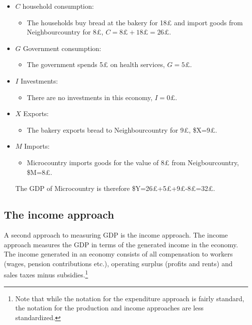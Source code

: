 \documentclass[]{book}
\providecommand{\tightlist}{%
  \setlength{\itemsep}{0pt}\setlength{\parskip}{0pt}}
\let\rmarkdownfootnote\footnote%
\def\footnote{\protect\rmarkdownfootnote}
\begin{document}
\begin{itemize}
\tightlist
\item
  \(C\) household consumption:

  \begin{itemize}
  \tightlist
  \item
    The households buy bread at the bakery for 18£ and import goods from Neighbourcountry for 8£, \(C=8£+18£=26£\).
  \end{itemize}
\item
  \(G\) Government consumption:

  \begin{itemize}
  \tightlist
  \item
    The government spends 5£ on health services, \(G=5£\).
  \end{itemize}
\item
  \(I\) Investments:

  \begin{itemize}
  \tightlist
  \item
    There are no investments in this economy, \(I=0£\).
  \end{itemize}
\item
  \(X\) Exports:

  \begin{itemize}
  \tightlist
  \item
    The bakery exports bread to Neighbourcountry for 9£, \$X=9£.
  \end{itemize}
\item
  \(M\) Imports:

  \begin{itemize}
  \tightlist
  \item
    Microcountry imports goods for the value of 8£ from Neigbourcountry, \$M=8£.
  \end{itemize}

  The GDP of Microcountry is therefore \$Y=26£+5£+9£-8£=32£.
\end{itemize}

\hypertarget{the-income-approach}{%
\subsection{The income approach}\label{the-income-approach}}

A second approach to measuring GDP is the income approach. The income approach measures the GDP in terms of the generated income in the economy. The income generated in an economy consists of all compensation to workers (wages, pension contributions etc.), operating surplus (profits and rents) and sales taxes minus subsidies.\footnote{Note that while the notation for the expenditure approach is fairly standard, the notation for the production and income approaches are less standardized.}
\end{document}

